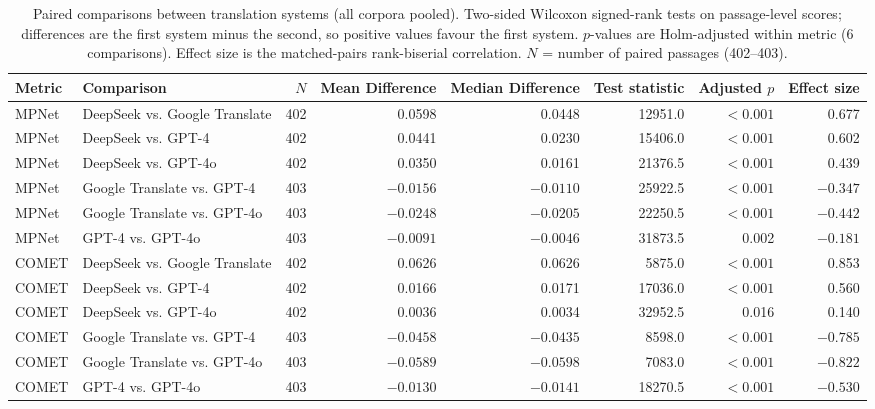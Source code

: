 \begin{table}[htbp]
\centering
\caption{Paired comparisons between translation systems (all corpora pooled). Two-sided Wilcoxon signed-rank tests on passage-level scores; differences are the first system minus the second, so positive values favour the first system. $p$-values are Holm-adjusted within metric (6 comparisons). Effect size is the matched-pairs rank-biserial correlation. $N$ = number of paired passages (402--403).}
\label{tab:paired_tests}
\small
\begin{tabular}{llrrrrrr}
\hline
\textbf{Metric} & \textbf{Comparison} & \textbf{$N$} & \textbf{Mean Difference} & \textbf{Median Difference} & \textbf{Test statistic} & \textbf{Adjusted $p$} & \textbf{Effect size} \\
\hline
MPNet & DeepSeek vs. Google Translate & 402 & 0.0598 & 0.0448 & 12951.0 & $<0.001$ & 0.677 \\
MPNet & DeepSeek vs. GPT-4 & 402 & 0.0441 & 0.0230 & 15406.0 & $<0.001$ & 0.602 \\
MPNet & DeepSeek vs. GPT-4o & 402 & 0.0350 & 0.0161 & 21376.5 & $<0.001$ & 0.439 \\
MPNet & Google Translate vs. GPT-4 & 403 & $-0.0156$ & $-0.0110$ & 25922.5 & $<0.001$ & $-0.347$ \\
MPNet & Google Translate vs. GPT-4o & 403 & $-0.0248$ & $-0.0205$ & 22250.5 & $<0.001$ & $-0.442$ \\
MPNet & GPT-4 vs. GPT-4o & 403 & $-0.0091$ & $-0.0046$ & 31873.5 & 0.002 & $-0.181$ \\
COMET & DeepSeek vs. Google Translate & 402 & 0.0626 & 0.0626 & 5875.0 & $<0.001$ & 0.853 \\
COMET & DeepSeek vs. GPT-4 & 402 & 0.0166 & 0.0171 & 17036.0 & $<0.001$ & 0.560 \\
COMET & DeepSeek vs. GPT-4o & 402 & 0.0036 & 0.0034 & 32952.5 & 0.016 & 0.140 \\
COMET & Google Translate vs. GPT-4 & 403 & $-0.0458$ & $-0.0435$ & 8598.0 & $<0.001$ & $-0.785$ \\
COMET & Google Translate vs. GPT-4o & 403 & $-0.0589$ & $-0.0598$ & 7083.0 & $<0.001$ & $-0.822$ \\
COMET & GPT-4 vs. GPT-4o & 403 & $-0.0130$ & $-0.0141$ & 18270.5 & $<0.001$ & $-0.530$ \\
\hline
\end{tabular}
\end{table}
